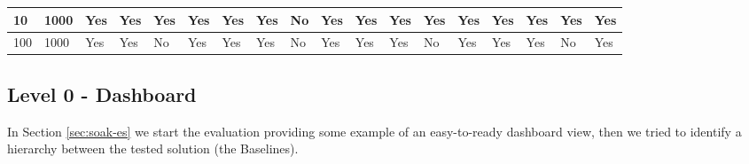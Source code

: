\begin{table}[h]
\begin{tabular}{ll|l|l|ll|l|l|l|l|l|l|ll|l|ll|l|}
\multicolumn{1}{|l|}{10}                                                          & 1000                                                         & Yes        & Yes       & \multicolumn{1}{l|}{Yes}   & Yes                        & Yes        & Yes       & \cellcolor[HTML]{9B9B9B}No & Yes                        & Yes        & Yes       & \multicolumn{1}{l|}{Yes}   & Yes                        & Yes & \multicolumn{1}{l|}{Yes} & Yes                        & Yes                        \\ \hline
\multicolumn{1}{|l|}{100}                                                         & 1000                                                         & Yes        & Yes       & \cellcolor[HTML]{9B9B9B}No & Yes                        & Yes        & Yes       & \cellcolor[HTML]{9B9B9B}No & Yes                        & Yes        & Yes       & \cellcolor[HTML]{9B9B9B}No & Yes                        & Yes & Yes                      & \cellcolor[HTML]{9B9B9B}No & Yes                        \\ \hline
\end{tabular}
\end{table}

\subsection{Level 0 - Dashboard}\label{sec:level0-step-dashboard}

In Section \ref{sec:soak-es} we start the evaluation providing some example of an easy-to-ready dashboard view, then we tried to identify a hierarchy between the tested solution (the Baselines). 

